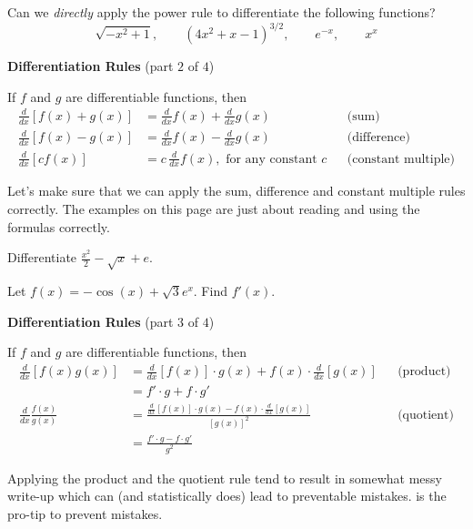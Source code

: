 \documentclass[../main.tex]{subfiles}
\begin{document}
\begin{example}
  Can we \emph{directly} apply the power rule to differentiate the following functions?
  \[
    \sqrt{-x^{2} + 1}, \qquad (4x^{2} + x - 1)^{3/2}, \qquad e^{-x}, \qquad x^{x}
  \]

\end{example}

\begin{mdframed}[style=simple]
  \textbf{Differentiation Rules} \hfill {\footnotesize (part \(2\) of \(4\))}

  If \(f\) and \(g\) are differentiable functions, then
  \begin{align*}
    \frac{d}{dx} [f(x) + g(x)] 
    &= \frac{d}{dx}f(x) + \frac{d}{dx}g(x)
    && \text{(sum)} \\[1em]
    \frac{d}{dx} [f(x) - g(x)] 
    &= \frac{d}{dx}f(x) - \frac{d}{dx}g(x)
    && \text{(difference)} \\[1em]
    \frac{d}{dx} [c f(x)] 
    &= c \, \frac{d}{dx} f(x), \text{ for any constant \(c\)}
    && \text{(constant multiple)}
  \end{align*}
\end{mdframed}
Let's make sure that we can apply the sum, difference and constant multiple rules correctly. The examples on this page are just about reading and using the formulas correctly. 

\begin{example}
  Differentiate \(\frac{x^{2}}{2} - \sqrt{x} + e\).

\end{example}

\begin{example}
  Let \(f(x) = -\cos(x) + \sqrt{3} e^{x}\).  Find \(f'(x)\).

\end{example}
\clearpage

\begin{mdframed}[style=simple]
  \textbf{Differentiation Rules} \hfill {\footnotesize (part \(3\) of \(4\))}

  If \(f\) and \(g\) are differentiable functions, then
  \begin{align*}
    \frac{d}{dx} [f(x)g(x)] 
    &= { \frac{d}{dx} [f(x)] \cdot g(x)+ f(x) \cdot \frac{d}{dx}[g(x)]}
    && \text{(product)} \\
    &= f' \cdot g + f \cdot g' \\[1em]
    \frac{d}{dx} \frac{f(x)}{g(x)}
    &= {\frac{\frac{d}{dx} [f(x)] \cdot g(x) - f(x) \cdot \frac{d}{dx}[g(x)] }{ [g(x)]^{2} }}
    && \text{(quotient)} \\
    &= \frac{f' \cdot g - f \cdot g'}{g^{2}}
  \end{align*}
\end{mdframed}
Applying the product and the quotient rule tend to result in somewhat messy write-up which can (and statistically does) lead to preventable mistakes.  is the pro-tip to prevent mistakes.
\end{document}
